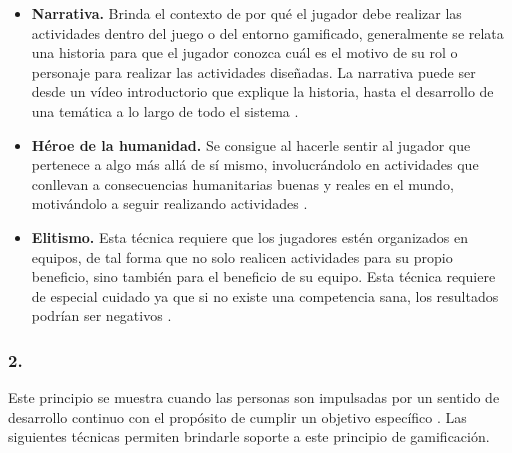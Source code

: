     \begin{itemize}
    \item
    {\bf Narrativa.}
        Brinda el contexto de por qué el jugador debe realizar las actividades dentro del juego o
        del entorno gamificado, generalmente se relata una historia para que el jugador conozca
        cuál es el motivo de su rol o personaje para realizar las actividades diseñadas.
        La narrativa puede ser desde un vídeo introductorio que explique la historia, hasta
        el desarrollo de una temática a lo largo de todo el sistema \cite[p. 81]{Octalysis}.

    \item
    {\bf Héroe de la humanidad.}
        Se consigue al hacerle sentir al jugador que pertenece a algo más allá de sí
        mismo, involucrándolo en actividades que conllevan a consecuencias
        humanitarias buenas y reales en el mundo, motivándolo a seguir realizando
        actividades \cite[p. 82]{Octalysis}.

    \item
    {\bf Elitismo.}
        Esta técnica requiere que los jugadores estén organizados en equipos, de tal forma que
        no solo realicen actividades para su propio beneficio, sino también para el beneficio
        de su equipo. Esta técnica requiere de especial cuidado ya que si no existe una competencia
        sana, los resultados podrían ser negativos \cite[p. 83]{Octalysis}.

    \end{itemize}

\subsubsection{2. \principioII} \label{subsec:principioII}

 Este principio se muestra cuando las personas son impulsadas por un sentido de desarrollo continuo
 con el propósito de cumplir un objetivo específico \cite[p. 91]{Octalysis}. Las siguientes técnicas
 permiten brindarle soporte a este principio de gamificación.

